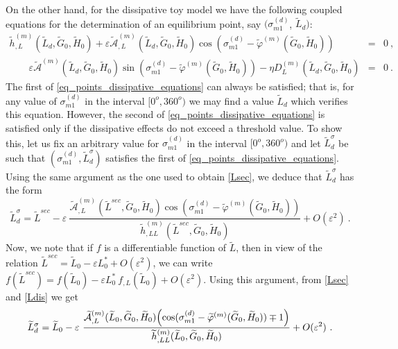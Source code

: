 \documentclass[12pt,reqno]{amsart}
\numberwithin{equation}{section}
\newcommand\beqa[1]{ \begin{eqnarray} \label{#1}}
\newcommand{\eeqa}{ \end{eqnarray} }
\begin{document}
On the other hand, for the dissipative toy model we have the following coupled equations for the determination of an equilibrium point, say $(\sigma_{m1}^{(d)}$, $\widetilde{L}_d)$:
\beqa{eq_points_dissipative_equations}
\widetilde{h}_{,L}^{(m)}(\widetilde{L}_d, \widetilde{G}_0, \widetilde{H}_0)+
\varepsilon \widetilde{\mathcal{A}}_{,L}^{(m)}(\widetilde{L}_d, \widetilde{G}_0, \widetilde{H}_0)
\cos (\sigma_{m1}^{(d)}-\widetilde{\varphi}^{(m)}( \widetilde{G}_0, \widetilde{H}_0))&=&0\ ,\nonumber\\
\qquad
\varepsilon \widetilde{\mathcal{A}}^{(m)}(\widetilde{L}_d, \widetilde{G}_0, \widetilde{H}_0)
\sin (\sigma_{m1}^{(d)}-\widetilde{\varphi}^{(m)}( \widetilde{G}_0, \widetilde{H}_0))
-\eta  D_L^{(m)} ( \widetilde{L}_d,  \widetilde{G}_0, \widetilde{H}_0)&=&0\ .
\eeqa
 The first of \eqref{eq_points_dissipative_equations} can always be satisfied; that is, for any value of $\sigma_{m1}^{(d)}$ in the interval $[0^o, 360^o)$ we may find a value
 $\widetilde{L}_d$ which verifies this equation. However, the second of \eqref{eq_points_dissipative_equations} is satisfied only if the dissipative effects do not exceed a threshold value. To show this, let us fix an arbitrary value for $\sigma_{m1}^{(d)}$ in the interval $[0^o, 360^o)$ and let $\widetilde{L}_d^\sigma$ be such that $(\sigma_{m1}^{(d)}, \widetilde{L}_d^\sigma)$ satisfies the first of \eqref{eq_points_dissipative_equations}.
Using the same argument as the one used to obtain \eqref{Lsec}, we deduce that  $\widetilde{L}_d^\sigma$ has the form
 \begin{equation}\label{Ldis}
 \widetilde{L}_{d}^\sigma=\widetilde{L}^{sec} - \varepsilon \ \frac{\widetilde{\mathcal{A}}_{,L}^{(m)}
 (\widetilde{L}^{sec}, \widetilde{G}_0, \widetilde{H}_0) \cos (\sigma_{m1}^{(d)}-\widetilde{\varphi}^{(m)}( \widetilde{G}_0, \widetilde{H}_0))}{\widetilde{h}_{,LL}^{(m)}(\widetilde{L}^{sec}, \widetilde{G}_0, \widetilde{H}_0)} +O(\varepsilon^2)\ .
\end{equation}
 Now, we note that if $f$ is a differentiable function of $\widetilde{L}$, then in view of the relation $ \widetilde{L}^{sec}=\widetilde{L}_{0} - \varepsilon L_0^* +O(\varepsilon^2)$, we can write $f(\widetilde{L}^{sec})=f(\widetilde{L}_{0})-\varepsilon L_0^*\ f_{,L}(\widetilde{L}_0)+O(\varepsilon^2)$. Using this argument, from \eqref{Lsec} and \eqref{Ldis} we get
\begin{equation}\label{Ldis0}
 \widetilde{L}_{d}^\sigma=\widetilde{L}_0 - \varepsilon \ \frac{\widetilde{\mathcal{A}}_{,L}^{(m)}
 (\widetilde{L}_0, \widetilde{G}_0, \widetilde{H}_0) \Bigl(\cos (\sigma_{m1}^{(d)}-\widetilde{\varphi}^{(m)}( \widetilde{G}_0, \widetilde{H}_0)) \mp 1\Bigr)}{\widetilde{h}_{,LL}^{(m)}(\widetilde{L}_0, \widetilde{G}_0, \widetilde{H}_0)} +O(\varepsilon^2)\ .
\end{equation}
\end{document}
